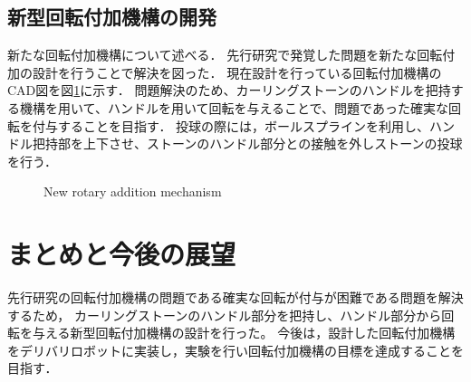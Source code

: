 \documentclass{classes/sice-si}
\begin{document}
\subsection{新型回転付加機構の開発}
新たな回転付加機構について述べる．
先行研究で発覚した問題を新たな回転付加の設計を行うことで解決を図った．
現在設計を行っている回転付加機構のCAD図を図\ref{fig:new}に示す．
問題解決のため、カーリングストーンのハンドルを把持する機構を用いて、ハンドルを用いて回転を与えることで、問題であった確実な回転を付与することを目指す．
投球の際には，ボールスプラインを利用し、ハンドル把持部を上下させ、ストーンのハンドル部分との接触を外しストーンの投球を行う．
\begin{figure}[H]
    \centering
    \begin{minipage}{0.6\linewidth}
        \caption{New rotary addition mechanism}
        \label{fig:new}
    \end{minipage}
    \centering
    \vspace{0pt} %
\end{figure}


\section{まとめと今後の展望}
先行研究の回転付加機構の問題である確実な回転が付与が困難である問題を解決するため，
カーリングストーンのハンドル部分を把持し、ハンドル部分から回転を与える新型回転付加機構の設計を行った。
今後は，設計した回転付加機構をデリバリロボットに実装し，実験を行い回転付加機構の目標を達成することを目指す．



\printbibliography[title=参考文献]
\end{document}
